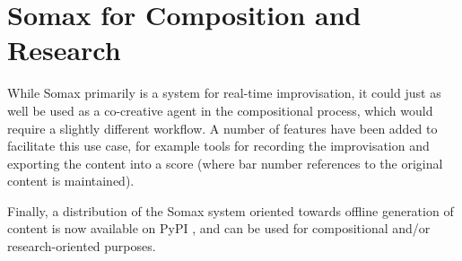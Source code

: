 \documentclass[10pt]{article}        %
\begin{document}
%
%



\section{Somax for Composition and Research}
While Somax primarily is a system for real-time improvisation, it could just as well be used as a co-creative agent in the compositional process, which would require a slightly different workflow. A number of features have been added to facilitate this use case, for example tools for recording the improvisation and exporting the content into a score (where bar number references to the original content is maintained). 

Finally, a distribution of the Somax system oriented towards offline generation of content is now available on PyPI \cite{somax2022pypi}, and can be used for compositional and/or research-oriented purposes.


{}

\end{document}
